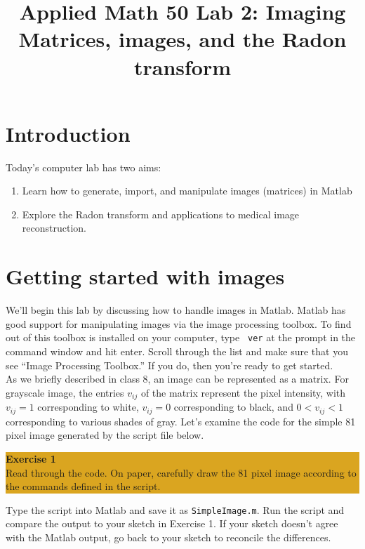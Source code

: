 \documentclass[12pt]{amsart}
\title{Applied Math 50 Lab 2: Imaging\\
Matrices, images, and the Radon transform
}
\date{}
\begin{document}
\maketitle

\section{Introduction}
Today's computer lab has two aims:
\begin{enumerate}
	\item Learn how to generate, import, and manipulate images (matrices) in Matlab
	\item Explore the Radon transform and applications to medical image reconstruction.
\end{enumerate}

\section{Getting started with images}

\noindent We'll begin this lab by discussing how to handle images in Matlab.  Matlab has good support for manipulating images via the image processing toolbox.  To find out of this toolbox is installed on your computer, type \verb+ ver+ at the prompt in the command window and hit enter.  Scroll through the list and make sure that you see ``Image Processing Toolbox.''  If you do, then you're ready to get started.  \\

\noindent  As we briefly described in class 8, an image can be represented as a matrix.  For grayscale image, the entries $v_{ij}$ of the matrix represent the pixel intensity, with $v_{ij} = 1$ corresponding to white, $v_{ij} = 0$ corresponding to black, and $0 < v_{ij} < 1$ corresponding to various shades of gray.    Let's examine the code for the simple 81 pixel image generated by the script file below.  

\bigskip

\begin{center}
\colorbox{Goldenrod}{\parbox{15cm}{
{
\textbf{\large Exercise 1}\vspace{1mm} \\
Read through the code.  On paper, carefully draw the 81 pixel image according to the commands defined in the script.  }}}
\end{center}
\bigskip



\smallskip


\noindent Type the script into Matlab and save it as \verb+SimpleImage.m+.  Run the script and compare the output to your sketch in Exercise 1.  If your sketch doesn't agree with the Matlab output, go back to your sketch to reconcile the differences.  \\
\end{document}
